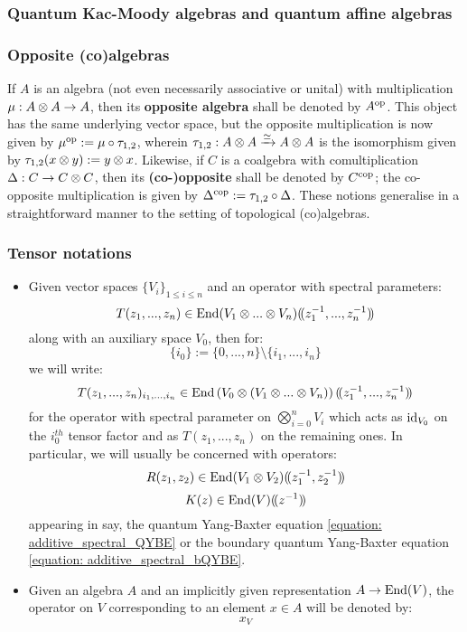         \subsubsection{Quantum Kac-Moody algebras and quantum affine algebras}

        \subsubsection{Opposite (co)algebras}
            If $A$ is an algebra (not even necessarily associative or unital) with multiplication $\mu: A \tensor A \to A$, then its \textbf{opposite algebra} shall be denoted by $A^{\mathrm{op}}$. This object has the same underlying vector space, but the opposite multiplication is now given by $\mu^{\mathrm{op}} := \mu \circ \tau_{1, 2}$, wherein $\tau_{1, 2}: A \tensor A \xrightarrow[]{\cong} A \tensor A$ is the isomorphism given by $\tau_{1, 2}(x \tensor y) := y \tensor x$. Likewise, if $C$ is a coalgebra with comultiplication $\Delta: C \to C \tensor C$, then its \textbf{(co-)opposite} shall be denoted by $C^{\mathrm{cop}}$; the co-opposite multiplication is given by $\Delta^{\mathrm{cop}} := \tau_{1, 2} \circ \Delta$. These notions generalise in a straightforward manner to the setting of topological (co)algebras.

        \subsubsection{Tensor notations}
            \begin{itemize}
                \item Given vector spaces $\{V_i\}_{1 \leq i \leq n}$ and an operator with spectral parameters:
                    $$T(z_1, ..., z_n) \in \End(V_1 \tensor ... \tensor V_n)(\!(z_1^{-1}, ..., z_n^{-1})\!)$$
                along with an auxiliary space $V_0$, then for:
                    $$\{i_0\} := \{0, ..., n\} \setminus \{i_1, ..., i_n\}$$
                we will write:
                    \begin{equation} \label{equation: tensor_factor_notation}
                        T(z_1, ..., z_n)_{i_1, ..., i_n} \in \End\left(V_0 \tensor (V_1 \tensor ... \tensor V_n)\right)(\!(z_1^{-1}, ..., z_n^{-1})\!)
                    \end{equation}
                for the operator with spectral parameter on $\bigotimes_{i = 0}^n V_i$ which acts as $\mathrm{id}_{V_0}$ on the $i_0^{th}$ tensor factor and as $T(z_1, ..., z_n)$ on the remaining ones. In particular, we will usually be concerned with operators:
                    $$R(z_1, z_2) \in \End(V_1 \tensor V_2)(\!(z_1^{-1}, z_2^{-1})\!)$$
                    $$K(z) \in \operatorname{End}(V)(\!(z^{-1})\!)$$
                appearing in say, the quantum Yang-Baxter equation \eqref{equation: additive_spectral_QYBE} or the boundary quantum Yang-Baxter equation \eqref{equation: additive_spectral_bQYBE}.
                \item Given an algebra $A$ and an implicitly given representation $A \to \operatorname{End}(V)$, the operator on $V$ corresponding to an element $x \in A$ will be denoted by:
                    $$x_V$$
            \end{itemize}

